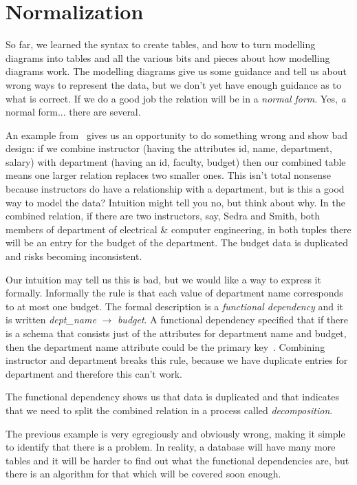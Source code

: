 \documentclass[a4paper]{report}
\begin{document}

\section*{Normalization}
So far, we learned the syntax to create tables, and how to turn modelling diagrams into tables and all the various bits and pieces about how modelling diagrams work. The modelling diagrams give us some guidance and tell us about wrong ways to represent the data, but we don't yet have enough guidance as to what is correct. If we do a good job the relation will be in a \textit{normal form}. Yes, \textit{a} normal form... there are several.

An example from~\cite{dsc} gives us an opportunity to do something wrong and show bad design: if we combine instructor (having the attributes id, name, department, salary) with department (having an id, faculty, budget) then our combined table means one larger relation replaces two smaller ones. This isn't total nonsense because instructors do have a relationship with a department, but is this a good way to model the data? Intuition might tell you no, but think about why. In the combined relation, if there are two instructors, say, Sedra and Smith, both members of department of electrical \& computer engineering, in both tuples there will be an entry for the budget of the department. The budget data is duplicated and risks becoming inconsistent.

Our intuition may tell us this is bad, but we would like a way to express it formally. Informally the rule is that each value of department name corresponds to at most one budget. The formal description is a \textit{functional dependency} and it is written \textit{dept\_name} $\rightarrow$ \textit{budget}. A functional dependency specified that if there is a schema that consists just of the attributes for department name and budget, then the department name attribute could be the primary key~\cite{dsc}. Combining instructor and department breaks this rule, because we have duplicate entries for department and therefore this can't work.

The functional dependency shows us that data is duplicated and that indicates that we need to split the combined relation in a process called \textit{decomposition}.

The previous example is very egregiously and obviously wrong, making it simple to identify that there is a problem. In reality, a database will have many more tables and it will be harder to find out what the functional dependencies are, but there is an algorithm for that which will be covered soon enough.
\end{document}

